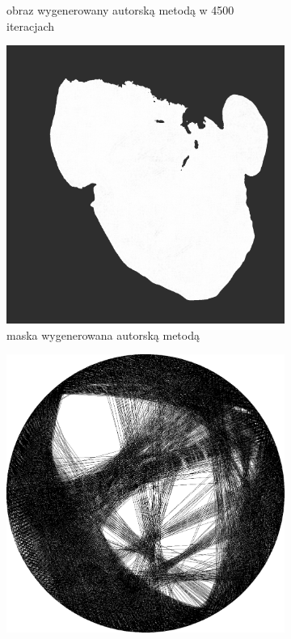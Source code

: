 \documentclass[a4paper, 12pt, polish, twoside]{extreport}
\begin{document}
\begin{figure}[H]
\begin{subfigure}{0.24\textwidth}
        \caption{obraz wygenerowany autorską metodą w 4500 iteracjach}
        \label{comp-comp-magdalene-k}
    \end{subfigure}
    \begin{subfigure}{0.24\textwidth}
        \centering
        \includegraphics[width = \textwidth]{img/6-comp/magdalene_mask_c20_inv0_bg10_obj1_ed1.png}
        \caption{maska wygenerowana autorską metodą}
        \label{comp-comp-magdalene-l}
    \end{subfigure}
    \begin{subfigure}{0.24\textwidth}
        \centering
        \includegraphics[width = \textwidth]{img/6-comp/magdalene_e_i3500_c20_inv0_bg10_obj1_ed1.png}

\end{subfigure}
\end{figure}
\end{document}
